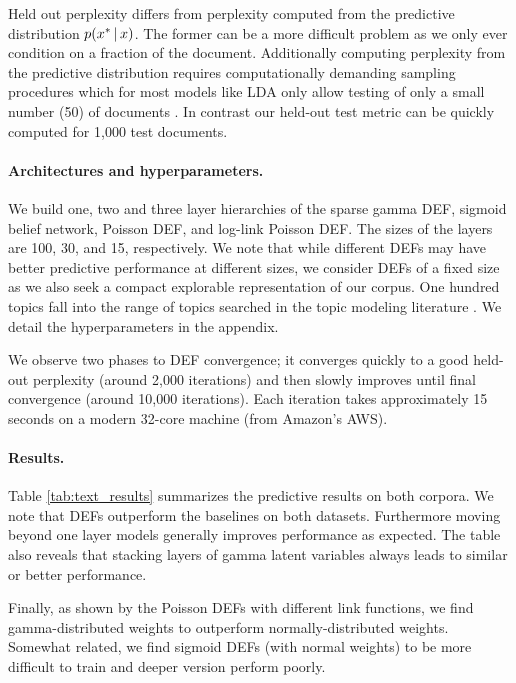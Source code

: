 \documentclass[twoside]{article}
\begin{document}
Held out perplexity differs from perplexity computed from the predictive distribution
$p(x^* \,\vert\, x)$. The former can be a more difficult problem as we only ever condition on a fraction
of the document. Additionally computing perplexity
from the predictive distribution requires computationally demanding sampling procedures which for 
most
models like LDA only allow testing of only a small number (50) of documents \citep{Wallach:2009a, Salakhutdinov:2009a}. 
In contrast our held-out test metric can be quickly computed for 1,000
test documents.



\paragraph{Architectures and hyperparameters.}
We build one, two and three layer hierarchies of the sparse gamma DEF,
sigmoid belief network, Poisson DEF, and log-link Poisson DEF. The sizes
of the layers are 100, 30, and 15, respectively. We note that while
different DEFs may have better predictive performance at different sizes, 
we consider DEFs of a fixed size as we also seek a compact explorable representation
of our corpus. One hundred topics fall into the range of topics searched in the topic modeling
literature \cite{Blei:2007}. We detail the hyperparameters in the appendix.

We observe two phases to DEF convergence; it converges quickly to a good held-out
perplexity (around 2,000 iterations) and then slowly improves until final
convergence (around 10,000 iterations). Each iteration takes approximately 15
seconds on a modern 32-core machine (from Amazon's AWS). 

\paragraph{Results.}
Table \ref{tab:text_results} summarizes the predictive results on both corpora.
We note that DEFs outperform the baselines on both datasets. 
Furthermore moving
beyond one layer models generally improves performance as expected.  
The table also reveals that stacking layers of gamma latent variables always leads to
similar or better performance.

Finally, as shown by the Poisson DEFs with different link functions, we find
gamma-distributed weights to outperform normally-distributed
weights. Somewhat related, we find sigmoid DEFs (with normal weights) to be more difficult
to train and deeper version perform poorly. 
\end{document}
